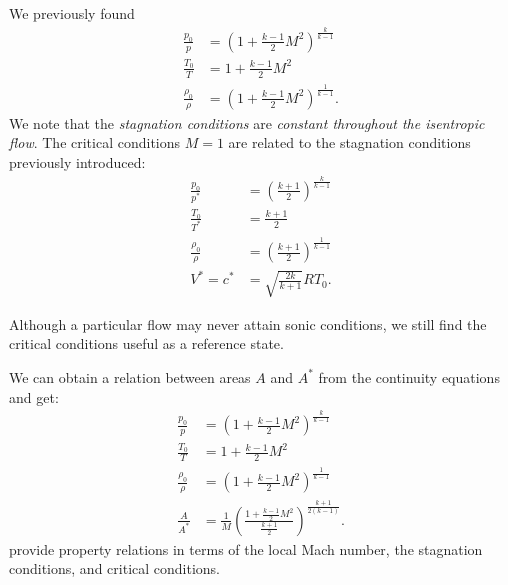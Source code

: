 We previously found
\begin{align}
  \frac{p_0}{p} &= \left( 1+ \frac{k-1}{2} M^2 \right)^{\frac{k}{k-1}} \\
  \frac{T_0}{T} &= 1 + \frac{k-1}{2}M^2 \\
  \frac{\rho_0}{\rho} &= \left( 1 + \frac{k-1}{2}M^2 \right)^{\frac{1}{k-1}}
.\end{align}
We note that the \textit{stagnation conditions} are \textit{constant throughout the isentropic flow}.
The critical conditions $M = 1$ are related to the stagnation conditions previously introduced:
\begin{align}
  \frac{p_0}{p^{*}} &= \left( \frac{k+1}{2} \right)^{\frac{k}{k-1}} \\
  \frac{T_0}{T^{*}} &= \frac{k+1}{2} \\
  \frac{\rho_0}{\rho} &= \left( \frac{k+1}{2} \right)^{\frac{1}{k-1}} \\
  V^{*} = c^{*} &= \sqrt{\frac{2k}{k+1}} RT_0
.\end{align}

Although a particular flow may never attain sonic conditions, we still find the critical conditions useful as a reference state.

We can obtain a relation between areas $A$ and $A^{*}$ from the continuity equations and get:
\begin{align} \label{eq:aastarrel}
  \frac{p_0}{p} &= \left( 1 + \frac{k-1}{2}M^2 \right)^{\frac{k}{k-1}} \\
  \frac{T_0}{T} &= 1 + \frac{k-1}{2}M^2 \\
  \frac{\rho_0}{\rho} &= \left( 1 + \frac{k-1}{2}M^2 \right)^{\frac{1}{k-1}} \\
  \frac{A}{A^{*}} &= \frac{1}{M} \left( \frac{1 + \frac{k-1}{2} M^2}{\frac{k+1}{2}} \right)^{\frac{k+1}{2 \left( k-1 \right)}}
.\end{align}
 provide property relations in terms of the local Mach number, the stagnation conditions, and critical conditions.
